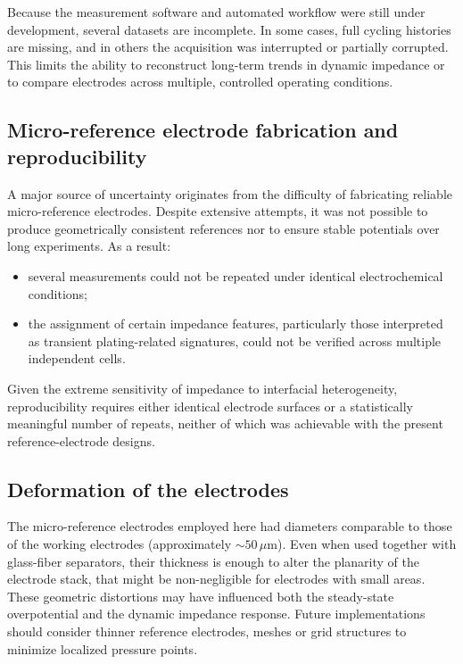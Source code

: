 Because the measurement software and automated workflow were still under development, several datasets are incomplete. 
In some cases, full cycling histories are missing, and in others the acquisition was interrupted or partially corrupted. 
This limits the ability to reconstruct long-term trends in dynamic impedance or to compare electrodes across multiple, controlled operating conditions.

\subsection*{Micro-reference electrode fabrication and reproducibility}

A major source of uncertainty originates from the difficulty of fabricating reliable micro-reference electrodes.  
Despite extensive attempts, it was not possible to produce geometrically consistent references nor to ensure stable potentials over long experiments. 
As a result:

\begin{itemize}
    \item several measurements could not be repeated under identical electrochemical conditions;
    \item the assignment of certain impedance features, particularly those interpreted as transient plating-related signatures, could not be verified across multiple independent cells.
\end{itemize}

Given the extreme sensitivity of impedance to interfacial heterogeneity, reproducibility requires either identical electrode surfaces or a statistically meaningful number of repeats, neither of which was achievable with the present reference-electrode designs.

\subsection*{Deformation of the electrodes}

The micro-reference electrodes employed here had diameters comparable to those of the working electrodes (approximately $\sim50\,\mu$m). Even when used together with glass-fiber separators, their thickness is enough to alter the planarity of the electrode stack, that might be non-negligible for electrodes with small areas.
These geometric distortions may have influenced both the steady-state overpotential and the dynamic impedance response. Future implementations should consider thinner reference electrodes, meshes or grid structures to minimize localized pressure points.

